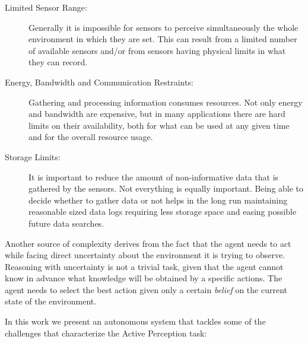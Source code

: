 \begin{description}
\item[Limited Sensor Range:] Generally it is impossible for sensors to perceive simultaneously the
    whole environment in which they are set. This can result from a limited number of available sensors
    and/or from sensors having physical limits in what they can record.
\item[Energy, Bandwidth and Communication Restraints:] Gathering and processing information consumes
    resources. Not only energy and bandwidth are expensive, but in many applications there are hard
    limits on their availability, both for what can be used at any given time and for the overall
    resource usage.
\item[Storage Limits:] It is important to reduce the amount of non-informative data that is gathered
    by the sensors. Not everything is equally important. Being able to decide whether to gather data or
    not helps in the long run maintaining reasonable sized data logs requiring less storage space and
    easing possible future data searches.
\end{description}

Another source of complexity derives from the fact that the agent needs to act while facing direct
uncertainty about the environment it is trying to observe. Reasoning with uncertainty is not a
trivial task, given that the agent cannot know in advance what knowledge will be obtained by a
specific actions. The agent needs to select the best action given only a certain \textit{belief} on
the current state of the environment.

In this work we present an autonomous system that tackles some of the challenges that characterize
the Active Perception task:

